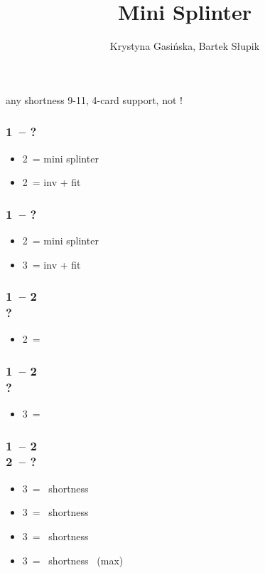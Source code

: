 \documentclass[12pt, a4paper]{article}
\title{Mini Splinter}
\author{Krystyna Gasińska, Bartek Słupik}
\begin{document}
\maketitle


any shortness 9-11, 4-card support, not \gf!

\subsubsection*{1\hearts\ -- ?}
\begin{itemize}
    \item 2\spades\ = mini splinter
    \item 2\nt\ = inv + fit
\end{itemize}

\subsubsection*{1\spades\ -- ?}
\begin{itemize}
    \item 2\nt\ = mini splinter
    \item 3\hearts\ = inv + fit
\end{itemize}

\subsubsection*{1\hearts\ -- 2\spades \\ ?}
\begin{itemize}
    \item 2\nt\ = \lsf
\end{itemize}

\subsubsection*{1\spades\ -- 2\nt \\ ?}
\begin{itemize}
    \item 3\clubs\ = \lsf
\end{itemize}

\subsubsection*{1\hearts\ -- 2\spades \\ 2\nt\ -- ?}
\begin{itemize}
    \item 3\clubs\ = \clubs\ shortness
    \item 3\diams\ = \diams\ shortness
    \item 3\hearts\ = \spades\ shortness
    \item 3\spades\ = \spades\ shortness \gf\ (max)
\end{itemize}
\end{document}
